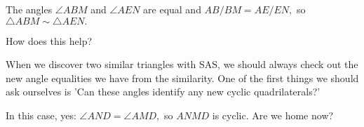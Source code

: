 The angles $\angle ABM$ and $\angle AEN$ are equal and $AB/BM = AE/EN,$ so $\triangle ABM \sim \triangle AEN.$


How does this help?

When we discover two similar triangles with SAS, we should always check out the new angle equalities we have from the similarity. One of the first things we should ask ourselves is 'Can these angles identify any new cyclic quadrilaterals?'



In this case, yes: $\angle AND = \angle AMD,$ so $ANMD$ is cyclic. Are we home now?








